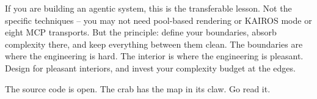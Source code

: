 \documentclass[
  english,
  11pt,
  letterpaper,
]{book}
\begin{document}
If you are building an agentic system, this is the transferable lesson.
Not the specific techniques -- you may not need pool-based rendering or
KAIROS mode or eight MCP transports. But the principle: define your
boundaries, absorb complexity there, and keep everything between them
clean. The boundaries are where the engineering is hard. The interior is
where the engineering is pleasant. Design for pleasant interiors, and
invest your complexity budget at the edges.

The source code is open. The crab has the map in its claw. Go read it.


\backmatter
\end{document}
